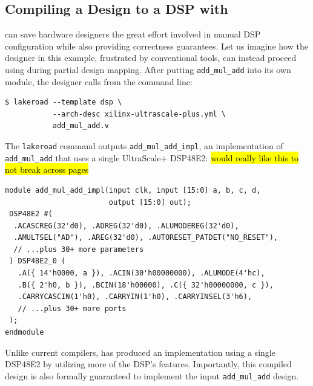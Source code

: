 

  
\subsection{Compiling a Design to a DSP with \lr}
\label{sec:overview-part-2}

\lr can save hardware designers
  the great effort involved
  in manual DSP configuration
  while also providing correctness guarantees.
Let us imagine how the designer 
  in this example,
  frustrated by conventional tools,
  can instead proceed using \lr
  during partial design mapping.
After putting 
  \texttt{add\_mul\_add}
  into its own module,
  the designer calls
  \lr from the command line:
\begin{verbatim}
$ lakeroad --template dsp \
           --arch-desc xilinx-ultrascale-plus.yml \
           add_mul_add.v
\end{verbatim}
The \texttt{lakeroad} command outputs
  \texttt{add\_mul\_add\_impl},
  an implementation
  of \texttt{add\_mul\_add}
  that uses a single UltraScale+ DSP48E2:
\hl{would really like this to not break across pages}
\begin{verbatim}
module add_mul_add_impl(input clk, input [15:0] a, b, c, d,
                        output [15:0] out);
 DSP48E2 #(
  .ACASCREG(32'd0), .ADREG(32'd0), .ALUMODEREG(32'd0),
  .AMULTSEL("AD"), .AREG(32'd0), .AUTORESET_PATDET("NO_RESET"), 
  // ...plus 30+ more parameters
 ) DSP48E2_0 (
   .A({ 14'h0000, a }), .ACIN(30'h00000000), .ALUMODE(4'hc),
   .B({ 2'h0, b }), .BCIN(18'h00000), .C({ 32'h00000000, c }),
   .CARRYCASCIN(1'h0), .CARRYIN(1'h0), .CARRYINSEL(3'h6),
   // ...plus 30+ more ports
 );
endmodule
\end{verbatim}
%
Unlike current compilers,
  \lr has produced an implementation
  using a single DSP48E2
  by utilizing more of the DSP's features.
Importantly, this compiled design
  is also formally guaranteed
  to implement
  the input \texttt{add\_mul\_add}
  design.
  
